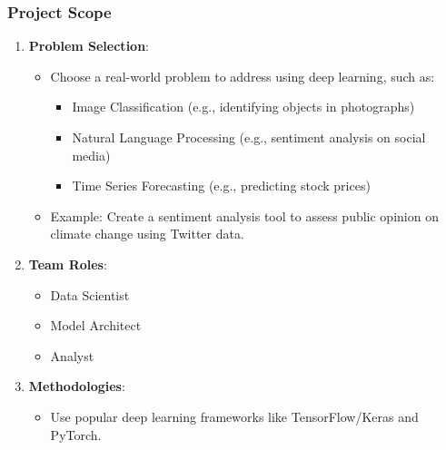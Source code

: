 \documentclass[aspectratio=169]{beamer}
\begin{document}
\begin{frame}[fragile]
    \frametitle{Project Scope}
    
    \begin{enumerate}
        \item \textbf{Problem Selection}:
        \begin{itemize}
            \item Choose a real-world problem to address using deep learning, such as:
            \begin{itemize}
                \item Image Classification (e.g., identifying objects in photographs)
                \item Natural Language Processing (e.g., sentiment analysis on social media)
                \item Time Series Forecasting (e.g., predicting stock prices)
            \end{itemize}
            \item Example: Create a sentiment analysis tool to assess public opinion on climate change using Twitter data.
        \end{itemize}
        
        \item \textbf{Team Roles}:
        \begin{itemize}
            \item Data Scientist
            \item Model Architect
            \item Analyst
        \end{itemize}

        \item \textbf{Methodologies}:
        \begin{itemize}
            \item Use popular deep learning frameworks like TensorFlow/Keras and PyTorch.
        \end{itemize}
    \end{enumerate}
\end{frame}
\end{document}
